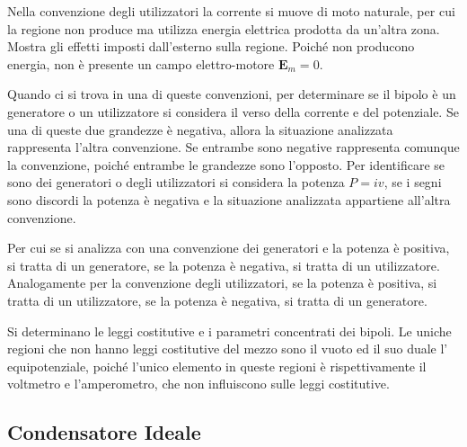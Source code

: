 \documentclass{article}
\newcommand{\vect}[1]{\boldsymbol{\mathbf{#1}}}
\numberwithin{equation}{subsection}
\begin{document}
Nella convenzione degli utilizzatori la corrente si muove di moto naturale, per cui la regione non produce ma utilizza energia elettrica prodotta da un'altra zona. Mostra 
gli effetti imposti dall'esterno sulla regione. Poiché non producono energia, non è presente un campo elettro-motore $\vect{E}_m=0$. 


Quando ci si trova in una di queste convenzioni, per determinare se il bipolo è un generatore o un utilizzatore si considera il verso della corrente e del potenziale. Se una 
di queste due grandezze è negativa, allora la situazione analizzata rappresenta l'altra convenzione. Se entrambe sono negative rappresenta comunque la convenzione, poiché 
entrambe le grandezze sono l'opposto. Per identificare se sono dei generatori o degli utilizzatori si considera la potenza $P=iv$, se i segni sono discordi la potenza è negativa 
e la situazione analizzata appartiene all'altra convenzione. 

Per cui se si analizza con una convenzione dei generatori e la potenza è positiva, si tratta di un generatore, se la potenza è negativa, si tratta di un utilizzatore. 
Analogamente per la convenzione degli utilizzatori, se la potenza è positiva, si tratta di un utilizzatore, se la potenza è negativa, si tratta di un generatore. 



Si determinano le leggi costitutive e i parametri concentrati dei bipoli. Le uniche regioni che non hanno leggi costitutive del mezzo sono il vuoto ed il suo duale l'
equipotenziale, poiché l'unico elemento in queste regioni è rispettivamente il voltmetro e l'amperometro, che non influiscono sulle leggi costitutive. 

\subsection{Condensatore Ideale}
\end{document}
